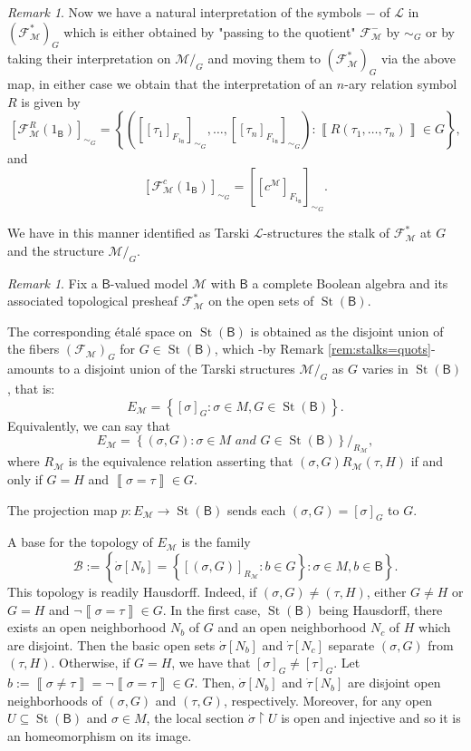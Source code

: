 \documentclass[11pt]{amsart}
\newcommand{\LL}{\mathcal{L}}
\newcommand{\F}{\mathcal{F}}
\theoremstyle{plain}
\theoremstyle{definition}
\theoremstyle{plain}
\theoremstyle{remark}
\newtheorem{remark}[theorem]{Remark}
\newcommand{\M}{\mathcal{M}}
\DeclareMathOperator{\St}{St}
\newcommand{\bool}[1]{\mathsf{#1}}
\newcommand{\cp}[1]{\left( #1 \right)}
\newcommand{\Qp}[1]{\left\llbracket #1 \right\rrbracket}
\newcommand{\bp}[1]{\left\lbrace #1 \right\rbrace}
\newcommand{\0}{\mathsf{0}}
\renewcommand{\1}{\mathsf{1}}
\renewcommand{\2}{\mathsf{2}}
\theoremstyle{definition}
\begin{document}
\begin{remark}
Now we have a natural interpretation of the symbols $-$ of $\LL$ in $(\F^*_\M)_G$ which is either obtained by "passing to the quotient" $\F_\M^{-}$ by $\sim_G$ or by taking their interpretation on $\M/_G$ and moving them to $(\F^*_\M)_G$ via the above map, in either case we obtain that the interpretation of an $n$-ary relation symbol $R$ is given by
\[
[\mathcal{F}_\M^R(1_\bool{B})]_{\sim_G}=\bp{([[\tau_1]_{F_{1_\bool{B}}}]_{\sim_G},\dots,[[\tau_n]_{F_{1_\bool{B}}}]_{\sim_G}):\Qp{R(\tau_1,\dots,\tau_n)}\in G},
\]
and
\[
[\mathcal{F}_\M^c(1_\bool{B})]_{\sim_G}=[[c^\M]_{F_{1_\bool{B}}}]_{\sim_G}.
\]

We have in this manner identified as Tarski $\LL$-structures the stalk of $\F^*_\M$ at $G$ and the  structure $\M/_G$.
\end{remark}


\begin{remark}
Fix a $\bool{B}$-valued model $\M$ with $\bool{B}$ a complete Boolean algebra and its associated topological presheaf $\F^*_\M$ on the open sets of $\St(\bool{B})$. 

The corresponding \'etal\'e space on $\St(\bool{B})$ is obtained as the disjoint union of the fibers $(\F_\M)_G$ for $G\in\St(\bool{B})$, which -by Remark \ref{rem:stalks=quots}- amounts to a disjoint union of the Tarski structures $\M/_G$ as $G$ varies in $\St(\bool{B})$, that is:
\[
E_\M=\bp{[\sigma]_G: \sigma\in M, G\in\St(\bool{B})}.
\]
Equivalently, we can say that
\[
E_\M=\bp{\cp{\sigma, G}: \sigma\in M\textit{ and }G\in\St(\bool{B})}/_{R_\M},
\]
where $R_\M$ is the equivalence relation asserting that $\cp{\sigma, G}R_\M\cp{\tau, H}$ if and only if 
$G=H$ and $\Qp{\sigma=\tau}\in G$.

The projection map $p:E_\M\to\St(\bool{B})$ sends each $\cp{\sigma, G}=[\sigma]_G$ to $G$.

A base for the topology of $E_\M$ is the family
\[
\mathcal{B}:=\bp{\dot{\sigma}[N_b]=\bp{[\cp{\sigma, G}]_{R_\M}: b\in G}: \sigma\in M, b\in\bool{B}}.
\]
This topology is readily Hausdorff. Indeed, if $\cp{\sigma, G}\neq\cp{\tau, H}$, either $G\neq H$ or $G=H$ and 
$\neg\Qp{\sigma=\tau}\in G$. In the first case, $\St(\bool{B})$ being Hausdorff, there exists an open 
neighborhood $N_b$ of $G$ and an open neighborhood $N_c$ of $H$ which are disjoint. Then the basic open 
sets $\dot{\sigma}[N_b]$ and $\dot{\tau}[N_c]$ separate $\cp{\sigma, G}$ from $\cp{\tau, H}$. 
Otherwise, if $G=H$, we have that $[\sigma]_G\neq[\tau]_G$. 
Let $b:=\Qp{\sigma\neq\tau}=\neg\Qp{\sigma=\tau}\in G$. 
Then, $\dot{\sigma}[N_b]$ and $\dot{\tau}[N_b]$ are disjoint open neighborhoods of 
$\cp{\sigma, G}$ and $\cp{\tau, G}$, respectively.
Moreover, for any open $U\subseteq\St(\bool{B})$ and $\sigma\in M$, the local section 
$\dot{\sigma}\restriction {U}$ is open and injective and so it is an homeomorphism on its image.
\end{remark}
\end{document}
